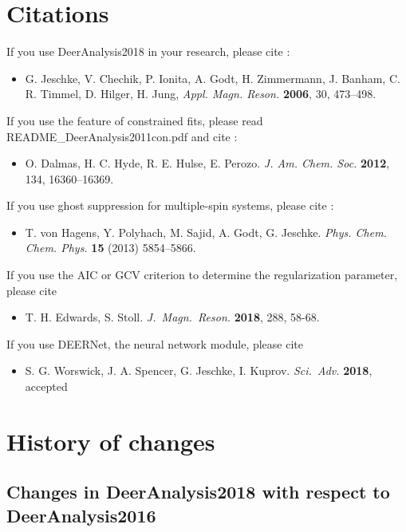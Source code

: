 \documentclass{article}
\begin{document}
\section{Citations}

If you use DeerAnalysis2018 in your research, please cite \cite{jeschke2006}:
\begin{itemize}
\item G. Jeschke, V. Chechik, P. Ionita, A. Godt, H. Zimmermann, J. Banham, C. R. Timmel, D. Hilger, H. Jung, \emph{Appl. Magn. Reson.} {\bf 2006}, 30, 473--498.
\end{itemize}

If you use the feature of constrained fits, please read {\ttfamily README\_DeerAnalysis2011con.pdf} and cite \cite{dalmas2012}:
\begin{itemize}
 \item O. Dalmas, H. C. Hyde, R. E. Hulse, E. Perozo. \emph{J. Am. Chem. Soc.} {\bf 2012}, 134, 16360--16369.
\end{itemize}

If you use ghost suppression for multiple-spin systems, please cite \cite{vonHagens2013}:
\begin{itemize}
\item T. von Hagens, Y. Polyhach, M. Sajid, A. Godt, G. Jeschke.
{\em Phys. Chem. Chem. Phys.} {\bf 15} (2013) 5854--5866.
\end{itemize}

If you use the AIC or GCV criterion to determine the regularization parameter, please cite \cite{edwards2018}
\begin{itemize}
\item
T. H. Edwards, S. Stoll.
\emph{J.~Magn.~Reson.} {\bf 2018}, 288, 58-68.
\end{itemize}

If you use DEERNet, the neural network module, please cite \cite{worswick2018}
\begin{itemize}
\item
S. G. Worswick, J. A. Spencer, G. Jeschke, I. Kuprov.
\emph{Sci.~Adv.} {\bf 2018}, accepted
\end{itemize}

\section{History of changes}
\subsection{Changes in DeerAnalysis2018 with respect to DeerAnalysis2016}
\label{changes_2018}
\end{document}
